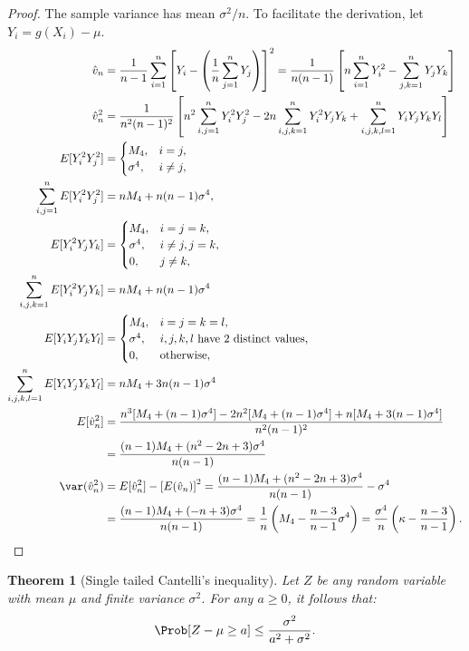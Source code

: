 \documentclass[12pt]{amsart}
\newcommand{\hv}{\hat{v}}
\newtheorem{theorem}{Theorem}
\begin{document}
\begin{proof}The sample variance has mean $\sigma^2/n$.  To facilitate the derivation, let $Y_i=g(X_i) - \mu$.
\begin{align*}
\hv_n & =  \frac 1{n-1} \sum_{i=1}^n \left[Y_i- \left(\frac 1n \sum_{j=1}^n Y_j\right) \right]^2
=  \frac 1{n(n-1)}\left[ n \sum_{i=1}^n Y^2_i-  \sum_{j,k=1}^n Y_jY_k \right] \\
\hv_n^2 & = \frac 1{n^2(n-1)^2}\left[ n^2 \sum_{i,j=1}^n Y^2_i Y^2_j  - 2 n \sum_{i,j,k=1}^n Y^2_i Y_j Y_k +  \sum_{i,j,k,l=1}^n Y_iY_j Y_k Y_l\right] \\
E[ Y^2_i Y^2_j] & = \begin{cases} M_4, & i=j,\\
\sigma^4, & i \ne j,
\end{cases}\\
\sum_{i,j=1}^n E[Y^2_i Y^2_j]&= n M_4 + n(n-1)\sigma^4, \\
E[ Y^2_i Y_j Y_k] & = \begin{cases} M_4, & i=j=k,\\
\sigma^4, & i \ne j, j=k,\\
0, & j \ne k,
\end{cases} \\
\sum_{i,j,k=1}^n E[Y^2_i Y_j Y_k] &= nM_4  + n(n-1)\sigma^4 \\
E[ Y_i Y_j Y_k Y_l] & = \begin{cases} M_4, & i=j=k=l,\\
\sigma^4, & i, j, k, l \text{ have 2 distinct values},\\
0, & \text{otherwise},
\end{cases}\\
\sum_{i,j,k,l=1}^n E[Y_iY_j Y_k Y_l] &= n M_4 + 3n(n-1)\sigma^4 \\
E[\hv_n^2] & = \frac{ n^3[M_4 + (n-1)\sigma^4]  - 2 n^2 [M_4 + (n-1)\sigma^4] +  n[M_4 + 3(n-1)\sigma^4]} {n^2(n-1)^2} \\
& = \frac{ (n-1)M_4 + (n^2-2n+3)\sigma^4} {n(n-1)} \\
\var(\hv_n^2) & = E[\hv_n^2] - \left[E(\hv_n)\right]^2 = \frac{ (n-1)M_4 + (n^2-2n+3)\sigma^4} {n(n-1)} -\sigma^4\\
& = \frac{(n-1)M_4 + (-n+3)\sigma^4} {n(n-1)}= \frac{1}{n} \left ( M_4 - \frac{n-3}{n-1} \sigma^4 \right) = \frac{\sigma^4}{n} \left ( \kappa  - \frac{n-3}{n-1} \right).
\end{align*}
\end{proof}
\begin{theorem}[Single tailed Cantelli's inequality]\label{Can}
Let $Z$ be any random variable with mean $\mu$ and finite variance $\sigma^2$.  For any $a\geq 0$, it
follows that:
\[
\Prob[Z-\mu \geq a]\leq \frac{\sigma^2}{a^2+\sigma^2}.
\]
\end{theorem}
\end{document}
